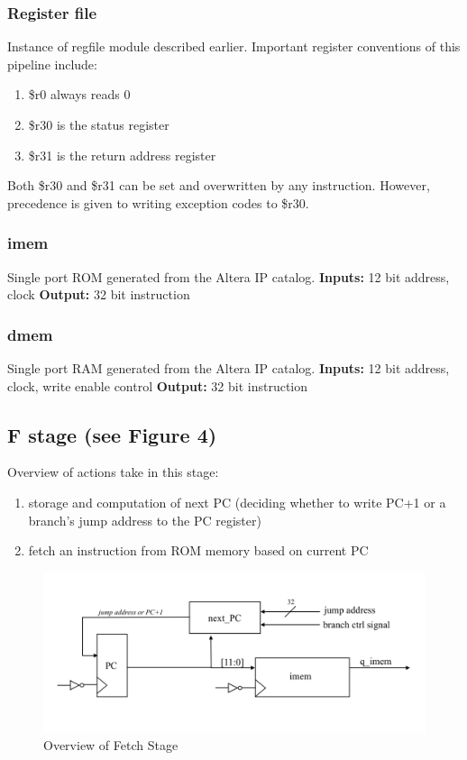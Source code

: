 \documentclass[letterpaper]{article}
\begin{document}
\subsubsection{Register file}
Instance of regfile module described earlier. Important register conventions of this pipeline include:
\begin{enumerate}
    \item \$r0 always reads 0
    \item \$r30 is the status register
    \item \$r31 is the return address register
\end{enumerate}
Both \$r30 and \$r31 can be set and overwritten by any instruction. However, precedence is given to writing exception codes to \$r30.
\subsubsection{imem}
Single port ROM generated from the Altera IP catalog. \newline
\textbf{Inputs:} 12 bit address, clock \newline
\textbf{Output:} 32 bit instruction
\subsubsection{dmem}
Single port RAM generated from the Altera IP catalog. \newline
\textbf{Inputs:} 12 bit address, clock, write enable control \newline
\textbf{Output:} 32 bit instruction

\subsection{F stage (see Figure 4)}
Overview of actions take in this stage:
\begin{enumerate}
    \item storage and computation of next PC (deciding whether to write PC+1 or a branch's jump address to the PC register)
    \item fetch an instruction from ROM memory based on current PC
\end{enumerate}
\begin{figure}[h]
    \centering
    \includegraphics[width=\textwidth]{Fetch.png}
    \caption{Overview of Fetch Stage}
    \label{fig:my_label}
\end{figure}
\end{document}
